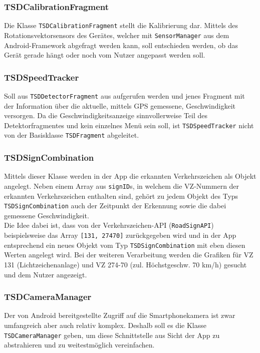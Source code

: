 \documentclass[12pt,a4paper,ngerman,enabledeprecatedfontcommands]{scrreprt}
\begin{document}
\subsubsection*{TSDCalibrationFragment}
Die Klasse \texttt{TSDCalibrationFragment} stellt die Kalibrierung dar. Mittels des Rotationsvektorsensors des Gerätes, welcher mit \texttt{SensorManager} aus dem Android-Framework abgefragt werden kann, soll entschieden werden, ob das Gerät gerade hängt oder noch vom Nutzer angepasst werden soll.\\

\subsubsection*{TSDSpeedTracker}
Soll aus \texttt{TSDDetectorFragment} aus aufgerufen werden und jenes Fragment mit der Information über die aktuelle, mittels GPS gemessene, Geschwindigkeit versorgen. Da die Geschwindigkeitsanzeige sinnvollerweise Teil des Detektorfragmentes und kein einzelnes Menü sein soll, ist \texttt{TSDSpeedTracker} nicht von der Basisklasse \texttt{TSDFragment} abgeleitet.\\

\subsubsection*{TSDSignCombination}
Mittels dieser Klasse werden in der \gls{App} die erkannten Verkehrszeichen als Objekt angelegt. Neben einem Array aus \texttt{signID}s, in welchem die \gls{VZ}-Nummern der erkannten Verkehrszeichen enthalten sind, gehört zu jedem Objekt des Typs \texttt{TSDSignCombination} auch der Zeitpunkt der Erkennung sowie die dabei gemessene Geschwindigkeit.\\
Die Idee dabei ist, dass von der \gls{Verkehrszeichen-API} (\texttt{RoadSignAPI}) beispielsweise das Array \texttt{[131, 27470]} zurückgegeben wird und in der App entsprechend ein neues Objekt vom Typ \texttt{TSDSignCombination} mit eben diesen Werten angelegt wird. Bei der weiteren Verarbeitung werden die Grafiken für \gls{VZ} 131 (Lichtzeichenanlage) und \gls{VZ} 274-70 (zul. Höchstgeschw. 70 km/h) gesucht und dem Nutzer angezeigt.\\

\subsubsection*{TSDCameraManager}
Der von Android bereitgestellte Zugriff auf die Smartphonekamera ist zwar umfangreich aber auch relativ komplex. Deshalb soll es die Klasse \texttt{TSDCameraManager} geben, um diese Schnittstelle aus Sicht der App zu abstrahieren und zu weitestmöglich vereinfachen.\\
\end{document}

